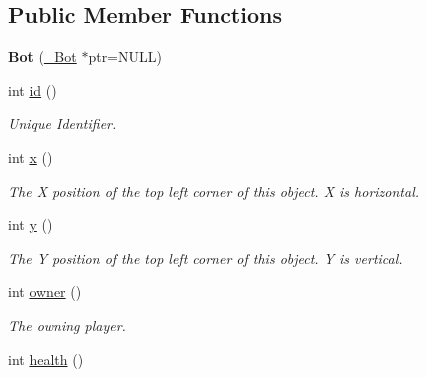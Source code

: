\subsection*{Public Member Functions}
\begin{DoxyCompactItemize}
\item 
\hypertarget{classBot_a5b75fd7e8eb162952a00394a3baff2df}{
{\bfseries Bot} (\hyperlink{struct__Bot}{\_\-Bot} $\ast$ptr=NULL)}
\label{classBot_a5b75fd7e8eb162952a00394a3baff2df}

\item 
\hypertarget{classBot_a465fcc505b25a8bd189abae0a08f903e}{
int \hyperlink{classBot_a465fcc505b25a8bd189abae0a08f903e}{id} ()}
\label{classBot_a465fcc505b25a8bd189abae0a08f903e}

\begin{DoxyCompactList}\small\item\em Unique Identifier. \item\end{DoxyCompactList}\item 
\hypertarget{classBot_aa2a50ed336378c5bf065fd69a42f147c}{
int \hyperlink{classBot_aa2a50ed336378c5bf065fd69a42f147c}{x} ()}
\label{classBot_aa2a50ed336378c5bf065fd69a42f147c}

\begin{DoxyCompactList}\small\item\em The X position of the top left corner of this object. X is horizontal. \item\end{DoxyCompactList}\item 
\hypertarget{classBot_a5d5c81be976e3dec23a378032fc290a2}{
int \hyperlink{classBot_a5d5c81be976e3dec23a378032fc290a2}{y} ()}
\label{classBot_a5d5c81be976e3dec23a378032fc290a2}

\begin{DoxyCompactList}\small\item\em The Y position of the top left corner of this object. Y is vertical. \item\end{DoxyCompactList}\item 
\hypertarget{classBot_ae8d6798379f4552dcc619c3a4b9744aa}{
int \hyperlink{classBot_ae8d6798379f4552dcc619c3a4b9744aa}{owner} ()}
\label{classBot_ae8d6798379f4552dcc619c3a4b9744aa}

\begin{DoxyCompactList}\small\item\em The owning player. \item\end{DoxyCompactList}\item 
\hypertarget{classBot_a0eecab2259afa7b3aeb596cccfcc4915}{
int \hyperlink{classBot_a0eecab2259afa7b3aeb596cccfcc4915}{health} ()}
\label{classBot_a0eecab2259afa7b3aeb596cccfcc4915}


\end{DoxyCompactItemize}
